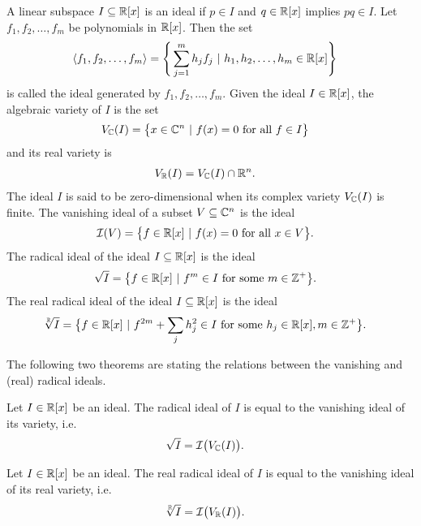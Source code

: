 A linear subspace $I \subseteq \mathbb{R}[x]$ is an ideal if $p\in I$ and $q\in\mathbb{R}[x]$ implies $pq \in I$.
Let $f_1, f_2, \ldots, f_m$ be polynomials in $\mathbb{R}[x]$. Then the set
\begin{align}
  \langle f_1, f_2, \ldots, f_m\rangle &= \Bigg\{\sum_{j=1}^mh_jf_j\ |\ h_1, h_2, \ldots, h_m\in\R[x]\Bigg\}
\end{align}
is called the ideal generated by $f_1, f_2, \ldots, f_m$.
Given the ideal $I\in\mathbb{R}[x]$, the algebraic variety of $I$ is the set
\begin{align}
  V_{\mathbb{C}}(I) &= \big\{x\in\mathbb{C}^n\ |\ f(x) = 0 \text{ for all } f\in I\big\}
\end{align}
and its real variety is
\begin{align}
  V_{\mathbb{R}}(I) &= V_{\mathbb{C}}(I) \cap \mathbb{R}^n.
\end{align}
The ideal $I$ is said to be zero-dimensional when its complex variety $V_{\mathbb{C}}(I)$ is finite.
The vanishing ideal of a subset $V\subseteq\mathbb{C}^n$ is the ideal
\begin{align}
  \mathcal{I}(V) &= \big\{f\in\mathbb{R}[x]\ |\ f(x) = 0 \text{ for all } x\in V\big\}.
\end{align}
The radical ideal of the ideal $I\subseteq \mathbb{R}[x]$ is the ideal
\begin{align}
  \sqrt{I} &= \big\{f\in\mathbb{R}[x]\ |\ f^m\in I \text{ for some } m\in\mathbb{Z}^+\big\}.
\end{align}
The real radical ideal of the ideal $I\subseteq \mathbb{R}[x]$ is the ideal
\begin{align}
  \sqrt[\mathbb{R}]{I} &= \big\{f\in\mathbb{R}[x]\ |\ f^{2m} + \sum_j h_j^2 \in I \text{ for some } h_j\in\mathbb{R}[x], m\in\mathbb{Z}^+\big\}.
\end{align}

The following two theorems are stating the relations between the vanishing and (real) radical ideals.

\begin{theorem}
  Let $I\in\mathbb{R}[x]$ be an ideal. The radical ideal of $I$ is equal to the vanishing ideal of its variety, i.e.\
  \begin{align}
    \sqrt{I} &= \mathcal{I}\big(V_{\mathbb{C}}(I)\big).
  \end{align}
\end{theorem}

\begin{theorem}
  Let $I\in\mathbb{R}[x]$ be an ideal. The real radical ideal of $I$ is equal to the vanishing ideal of its real variety, i.e.\
  \begin{align}
    \sqrt[\mathbb{R}]{I} &= \mathcal{I}\big(V_{\mathbb{R}}(I)\big).
  \end{align}
\end{theorem}

